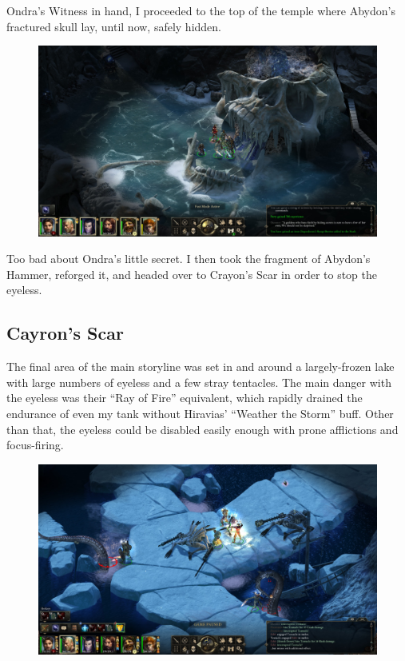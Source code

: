 \documentclass{article}
\begin{document}
Ondra's Witness in hand, I proceeded to the top of the temple where Abydon's fractured skull lay, until now, safely hidden.

\begin{figure}
\includegraphics[scale=0.33]{files/blog/2020_01_18_poe_potd_wmpt2/2020_01_18_abbey12.jpg}
\end{figure}

Too bad about Ondra's little secret.  I then took the fragment of Abydon's Hammer, reforged it, and headed over to Crayon's Scar in order to stop the eyeless.

\subsection{Cayron's Scar}
The final area of the main storyline was set in and around a largely-frozen lake with large numbers of eyeless and a few stray tentacles.  The main danger with the eyeless was their ``Ray of Fire'' equivalent, which rapidly drained the endurance of even my tank without Hiravias' ``Weather the Storm'' buff.  Other than that, the eyeless could be disabled easily enough with prone afflictions and focus-firing.

\begin{figure}
\includegraphics[scale=0.33]{files/blog/2020_01_18_poe_potd_wmpt2/2020_01_18_cayron1.jpg}
\end{figure}
\end{document}
